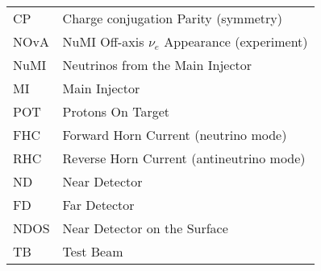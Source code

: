 \documentclass[12pt,a4paper]{report}
\begin{document}
\begin{table}[H]
\begin{tabular}{ll}
CP         & Charge conjugation Parity (symmetry)              \\
NOvA       & NuMI Off-axis $\nu_e$ Appearance (experiment)     \\
NuMI       & Neutrinos from the Main Injector                  \\
MI         & Main Injector                                     \\
POT        & Protons On Target                                 \\
FHC        & Forward Horn Current (neutrino mode)              \\
RHC        & Reverse Horn Current (antineutrino mode)          \\
ND         & Near Detector                                     \\
FD         & Far Detector                                      \\
NDOS       & Near Detector on the Surface                      \\
TB         & Test Beam                                         \\

\end{tabular}
\end{table}
\end{document}
